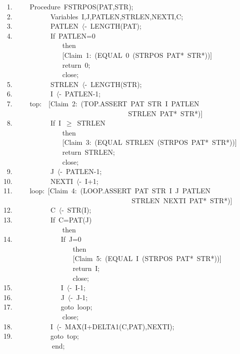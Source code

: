 \documentclass[11pt]{book}
\newenvironment{pubasis}{\begin{flushleft}\ttfamily\small}{\normalsize\rmfamily\end{flushleft}}
\begin{document}
\pagebreak
\begin{pubasis}
~1.~~~~~Procedure~FSTRPOS(PAT,STR);\\
~2.~~~~~~~~~~~Variables~I,J,PATLEN,STRLEN,NEXTI,C;\\

~3.~~~~~~~~~~~PATLEN~$\langle$-~LENGTH(PAT);\\
~4.~~~~~~~~~~~If~PATLEN=0\\
~~~~~~~~~~~~~~~~~then\\
~~~~~~~~~~~~~~~~~{[}Claim~1:~(EQUAL~0~(STRPOS~PAT*~STR*)){]}\\
~~~~~~~~~~~~~~~~~return~0;\\
~~~~~~~~~~~~~~~~~close;\\

~5.~~~~~~~~~~~STRLEN~$\langle$-~LENGTH(STR);\\
~6.~~~~~~~~~~~I~$\langle$-~PATLEN-1;\\

~7.~~~~~top:~~{[}Claim~2:~(TOP.ASSERT~PAT~STR~I~PATLEN\\
~~~~~~~~~~~~~~~~~~~~~~~~~~~~~~~~~~~~STRLEN~PAT*~STR*)]\\

~8.~~~~~~~~~~~If~I~$\geq$~STRLEN\\
~~~~~~~~~~~~~~~~~then\\
~~~~~~~~~~~~~~~~~{[}Claim~3:~(EQUAL~STRLEN~(STRPOS~PAT*~STR*)){]}\\
~~~~~~~~~~~~~~~~~return~STRLEN;\\
~~~~~~~~~~~~~~~~~close;\\

~9.~~~~~~~~~~~J~$\langle$-~PATLEN-1;\\
10.~~~~~~~~~~~NEXTI~$\langle$-~I+1;\\

11.~~~~~loop:~{[}Claim~4:~(LOOP.ASSERT~PAT~STR~I~J~PATLEN\\
~~~~~~~~~~~~~~~~~~~~~~~~~~~~~~~~~~~~~STRLEN~NEXTI~PAT*~STR*)]\\

12.~~~~~~~~~~~C~$\langle$-~STR(I);\\
13.~~~~~~~~~~~If~C=PAT(J)\\
~~~~~~~~~~~~~~~~~then\\
14.~~~~~~~~~~~~~~If~J=0\\
~~~~~~~~~~~~~~~~~~~~then\\
~~~~~~~~~~~~~~~~~~~~{[}Claim~5:~(EQUAL~I~(STRPOS~PAT*~STR*)){]}\\
~~~~~~~~~~~~~~~~~~~~return~I;\\
~~~~~~~~~~~~~~~~~~~~close;\\
15.~~~~~~~~~~~~~~I~$\langle$-~I-1;\\
16.~~~~~~~~~~~~~~J~$\langle$-~J-1;\\
17.~~~~~~~~~~~~~~goto~loop;\\
~~~~~~~~~~~~~~~~~close;\\

18.~~~~~~~~~~~I~$\langle$-~MAX(I+DELTA1(C,PAT),NEXTI);\\
19.~~~~~~~~~~~goto~top;\\

~~~~~~~~~~~~~~end;\\
\end{pubasis}
\end{document}
